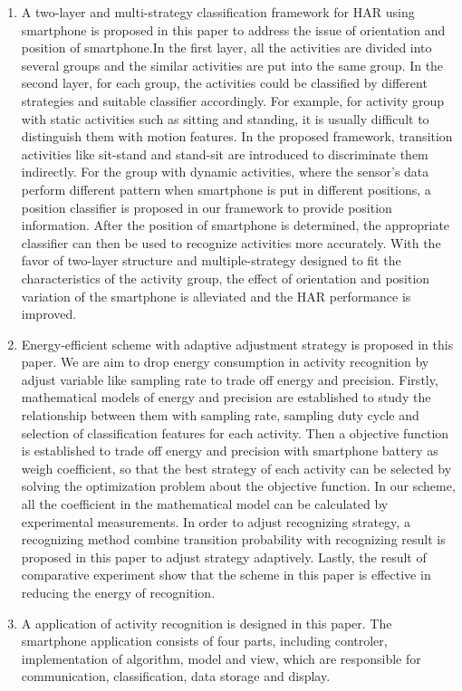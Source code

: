 \begin{enabstract}
\begin{enumerate}
	\item A two-layer and multi-strategy classification framework for HAR using smartphone is proposed in this paper to address the issue of orientation and position of smartphone.In the first layer, all the activities are divided into several groups and the similar activities are put into the same group. In the second layer, for each group, the activities could be classified by different strategies and suitable classifier accordingly. For example, for activity group with static activities such as sitting and standing, it is usually difficult to distinguish them with motion features. In the proposed framework, transition activities like sit-stand and stand-sit are introduced to discriminate them indirectly. For the group with dynamic activities, where the sensor’s data perform different pattern when smartphone is put in different positions, a position classifier is proposed in our framework to provide position information. After the position of smartphone is determined, the appropriate classifier can then be used to recognize activities more accurately. With the favor of two-layer structure and multiple-strategy designed to fit the characteristics of the activity group, the effect of orientation and position variation of the smartphone is alleviated and the HAR performance is improved.
	\item Energy-efficient scheme with adaptive adjustment strategy is proposed in this paper. We are aim to drop energy consumption in activity recognition by adjust variable like sampling rate to trade off energy and precision. Firstly, mathematical models of energy and precision are established to study the relationship between them with sampling rate, sampling duty cycle and selection of classification features for each activity. Then a objective function is established to trade off energy and precision with smartphone battery as weigh coefficient, so that the best strategy of each activity can be selected by solving the optimization problem about the objective function. In our scheme, all the coefficient in the mathematical model can be calculated by experimental measurements. In order to adjust recognizing strategy, a recognizing method combine transition probability with recognizing result is proposed in this paper to adjust strategy adaptively. Lastly, the result of comparative experiment show that the scheme in this paper is effective in reducing the energy of recognition.
	\item A application of activity recognition is designed in this paper. The smartphone application consists of four parts, including controler, implementation of algorithm, model and view, which are responsible for communication, classification, data storage and display.
 \end{enumerate}
\end{enabstract}
